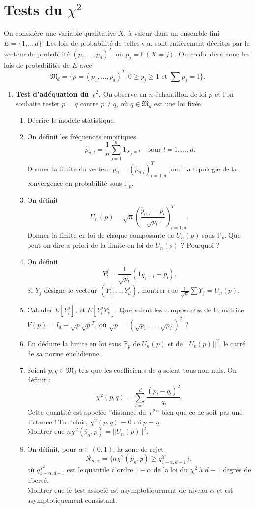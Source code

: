 \section{ Tests du $\chi^2$}

On considère une variable qualitative $X$, à valeur dans un ensemble fini $E=\{1,..,d\}$. Les lois de probabilité de telles v.a. sont entièrement décrites par le vecteur de probabilité $(p_1,...,p_d)^T$, où $p_j=\mathbb P(X=j)$. On confondera donc les lois de probabilités de $E$ avec 
\[\mathfrak M_d=\{p=(p_1,...,p_d)^T : 0\geq p_j\geq 1 \text{ et } \sum p_j = 1\}.\]

\begin{enumerate}
\item \textbf{Test d'adéquation du $\chi^2$.} On observe un $n$-échantillon de loi $p$ et l'on souhaite tester $p=q$ contre $p\neq q$, où $q\in \mathfrak M_d$ est une loi fixée.
\begin{enumerate}
\item Décrire le modèle statistique.
\item On définit les fréquences empiriques
\[\ \hat p_{n,l} = \frac{1}{n}\sum_{j=1}^n 1_{X_j=l}\quad\text{pour }l=1,...,d.\]
Donner la limite du vecteur $\hat p_n=(\hat p_{n,l} )_{l=1,d}^T$ pour la topologie de la convergence en probabilité sous $\mathbb P_p$.
\item On définit
\[U_n(p)=\sqrt{n}(\frac{\hat p_{n,l}-p_l}{\sqrt{p_l}})_{l=1,d}^T.\]
Donner la limite en loi de chaque composante de $U_n(p)$ sous $\mathbb P_p$. Que peut-on dire a priori de la limite en loi de $U_n(p)$ ? Pourquoi ?
\item On définit
\[Y_l^j = \frac{1}{\sqrt{p_l}}(1_{X_j=l}-p_l).\]
Si $Y_j$ désigne le vecteur $(Y_1^j, ... ,Y_d^j) $, montrer que $\frac{1}{\sqrt{n}}\sum Y_j = U_n(p)$.
\item Calculer $E[Y^j _l ]$, et $E[Y^j _l Y_{l'}^j]$. Que valent les composantes de la matrice $V(p)= I_d- \sqrt{p}\sqrt{p}^T$, où $\sqrt{p}=(\sqrt{p_1}, ... , \sqrt{p_d})^T$ ?
\item En déduire la limite en loi sous $\mathbb P_p$ de $U_n(p)$ et de $||U_n(p)||^2$, le carré de sa norme euclidienne.
\item Soient $p,q\in \mathfrak M_d$ tels que les coefficients de $q$ soient tous non nuls. On définit :
\[\chi^2 (p,q) = \sum_{l=1}^d\frac{(p_l-q_l)^2}{q_l}.\]
Cette quantité est appelée ''distance du $\chi^2$'' bien que ce ne soit pas une distance ! Toutefois, $\chi^2(p,q)=0$ ssi $p=q$.\\
Montrer que $n\chi^2(\hat p_n,p)= ||U_n(p)||^2$.
\item On définit, pour $\alpha \in (0,1)$, la zone de rejet
\[\mathcal R_{n,\alpha}=\{n\chi^2(\hat p_n,p)\geq q_{1-\alpha, d-1}^{\chi^2}\},\]
où $q_{1-\alpha, d-1}^{\chi^2}$ est le quantile d'ordre $1-\alpha$ de la loi du $\chi^2$ à $d-1$ degrés de liberté.\\
Montrer que le test associé est asymptotiquement de niveau $\alpha$ et est asymptotiquement consistant.
\end{enumerate}

\end{enumerate}
